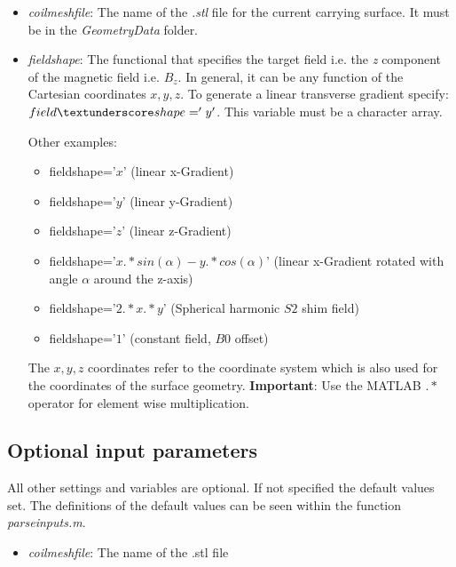 \documentclass[a4paper,12pt]{book}
\begin{document}
\begin{itemize}
\item  \textit{coil\textunderscore mesh\textunderscore file}: The name of the \textit{.stl} file for the current carrying surface.  It must be in the\textit{ Geometry\textunderscore Data} folder.
\item  \textit{field\textunderscore shape}: The functional that specifies the target field i.e. the \textit{z} component of the magnetic field i.e. $B_{z}$. In general, it can be any function of the Cartesian coordinates $x,y,z$. To generate a linear transverse gradient specify: $field\textunderscore shape='y'$. This variable must be a character array. 

Other examples: 
\begin{itemize}
	\item  field\textunderscore shape='$x$' (linear x-Gradient)
	\item  field\textunderscore shape='$y$' (linear y-Gradient)
	\item  field\textunderscore shape='$z$' (linear z-Gradient)
	\item  field\textunderscore shape='$x.*sin(\alpha)-y.*cos(\alpha)$' (linear x-Gradient rotated with angle $\alpha$ around the z-axis)
	\item  field\textunderscore shape='$2.*x.*y$' (Spherical harmonic $S2$ shim field)
	\item  field\textunderscore shape='$1$' (constant field,  $B0$ offset)
\end{itemize}

The $x,y,z$ coordinates refer to the coordinate system which is also used for the coordinates of the surface geometry.
\textbf{Important}: Use the MATLAB $.*$ operator for element wise multiplication.

\end{itemize}

\subsection{Optional input parameters}

All other settings and variables are optional. If not specified the default values set. The definitions of the default values can be seen within the function \textit{parse\textunderscore inputs.m}.


\begin{itemize}
	\item  \textit{coil\textunderscore mesh\textunderscore file}: The name of the .stl file 
\end{itemize}


\end{document}
